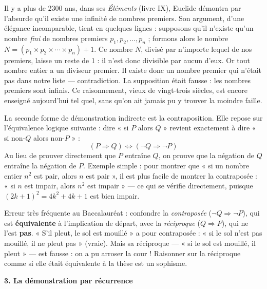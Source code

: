 \documentclass[11pt]{article}
\newcommand{\cle}[1]{{\popxbold\color{popdark}#1}}
\begin{document}
\begin{savaistu}
Il y a plus de 2300 ans, dans ses \emph{Éléments} (livre IX), Euclide démontra par l'absurde qu'il existe une infinité de nombres premiers. Son argument, d'une élégance incomparable, tient en quelques lignes : supposons qu'il n'existe qu'un nombre \emph{fini} de nombres premiers $p_1, p_2, \ldots, p_n$ ; formons alors le nombre $N = (p_1 \times p_2 \times \cdots \times p_n) + 1$. Ce nombre $N$, divisé par n'importe lequel de nos premiers, laisse un reste de 1 : il n'est donc divisible par aucun d'eux. Or tout nombre entier a un diviseur premier. Il existe donc un nombre premier qui n'était pas dans notre liste — contradiction. La supposition était fausse : les nombres premiers sont infinis. Ce raisonnement, vieux de vingt-trois siècles, est encore enseigné aujourd'hui tel quel, sans qu'on ait jamais pu y trouver la moindre faille.
\end{savaistu}

La seconde forme de démonstration indirecte est la \cle{contraposition}. Elle repose sur l'équivalence logique suivante : dire « si $P$ alors $Q$ » revient exactement à dire « si non-$Q$ alors non-$P$ » :
\[ (P \Rightarrow Q) \Leftrightarrow (\neg Q \Rightarrow \neg P) \]
Au lieu de prouver directement que $P$ entraîne $Q$, on prouve que la négation de $Q$ entraîne la négation de $P$. Exemple simple : pour montrer que « si un nombre entier $n^2$ est pair, alors $n$ est pair », il est plus facile de montrer la contraposée : « si $n$ est impair, alors $n^2$ est impair » — ce qui se vérifie directement, puisque $(2k+1)^2 = 4k^2 + 4k + 1$ est bien impair.

\begin{attention}
Erreur très fréquente au Baccalauréat : confondre la \emph{contraposée} ($\neg Q \Rightarrow \neg P$), qui est \textbf{équivalente} à l'implication de départ, avec la \emph{réciproque} ($Q \Rightarrow P$), qui ne l'est \textbf{pas}. « S'il pleut, le sol est mouillé » a pour contraposée : « si le sol n'est pas mouillé, il ne pleut pas » (vraie). Mais sa réciproque — « si le sol est mouillé, il pleut » — est fausse : on a pu arroser la cour ! Raisonner sur la réciproque comme si elle était équivalente à la thèse est un sophisme.
\end{attention}

\textbf{3. La démonstration par récurrence}\par
\end{document}
